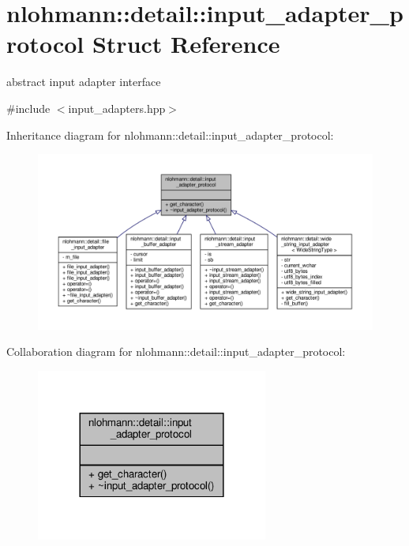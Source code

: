 \hypertarget{structnlohmann_1_1detail_1_1input__adapter__protocol}{}\section{nlohmann\+:\+:detail\+:\+:input\+\_\+adapter\+\_\+protocol Struct Reference}
\label{structnlohmann_1_1detail_1_1input__adapter__protocol}


abstract input adapter interface  




{\ttfamily \#include $<$input\+\_\+adapters.\+hpp$>$}



Inheritance diagram for nlohmann\+:\+:detail\+:\+:input\+\_\+adapter\+\_\+protocol\+:
\nopagebreak
\begin{figure}[H]
\begin{center}
\leavevmode
\includegraphics[width=350pt]{structnlohmann_1_1detail_1_1input__adapter__protocol__inherit__graph}
\end{center}
\end{figure}


Collaboration diagram for nlohmann\+:\+:detail\+:\+:input\+\_\+adapter\+\_\+protocol\+:
\nopagebreak
\begin{figure}[H]
\begin{center}
\leavevmode
\includegraphics[width=216pt]{structnlohmann_1_1detail_1_1input__adapter__protocol__coll__graph}
\end{center}
\end{figure}
